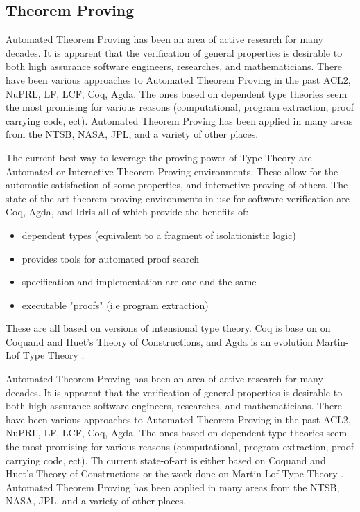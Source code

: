 \subsection{Theorem Proving}

Automated Theorem Proving has been an area of active research for many decades. It is apparent that the
verification of general properties is desirable to both high assurance software engineers, researches, and
mathematicians. There have been various approaches to Automated Theorem Proving in the past ACL2, NuPRL, LF,
LCF, Coq, Agda. The ones based on dependent type theories seem the most promising for various reasons
(computational, program extraction, proof carrying code, ect). Automated Theorem Proving has been applied in
many areas from the NTSB, NASA, JPL, and a variety of other places.

The current best way to leverage the proving power of Type Theory are Automated or Interactive Theorem Proving
environments. These allow for the automatic satisfaction of some properties, and interactive proving of others.
The state-of-the-art theorem proving environments in use for software verification are Coq, Agda, and Idris
all of which provide the benefits of:
\begin{itemize}
    \item dependent types (equivalent to a fragment of isolationistic logic)
    \item provides tools for automated proof search
    \item specification and implementation are one and the same
    \item executable "proofs" (i.e program extraction)
\end{itemize}

These are all based on versions of intensional type theory. Coq is base on
on Coquand and Huet's Theory of Constructions, and Agda is an evolution
Martin-Lof Type Theory \cite{martinlof}.

Automated Theorem Proving has been an area of active research for many decades. It is apparent that the
verification of general properties is desirable to both high assurance software engineers, researches, and
mathematicians. There have been various approaches to Automated Theorem Proving in the past ACL2, NuPRL, LF,
LCF, Coq, Agda. The ones based on dependent type theories seem the most promising for various reasons
(computational, program extraction, proof carrying code, ect). Th current state-of-art is either based
on Coquand and Huet's Theory of Constructions or the work done on Martin-Lof Type Theory \cite{martinlof}.
Automated Theorem Proving has been applied in many areas from the NTSB, NASA, JPL, and a variety of other places.

